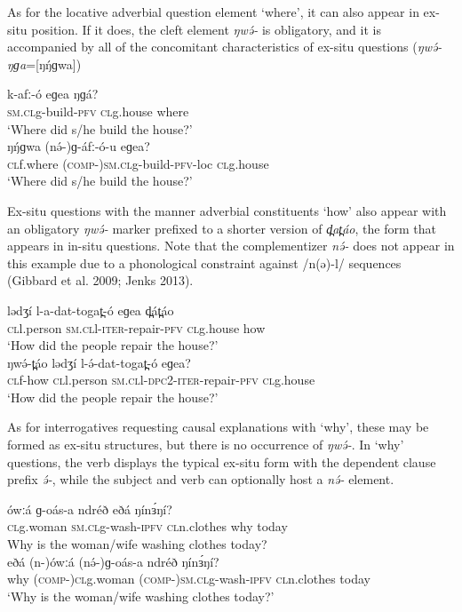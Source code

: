 As for the locative adverbial question element ‘where’, it can also appear in ex-situ position. If it does, the cleft element \textit{ŋwə́-} is obligatory, and it is accompanied by all of the concomitant characteristics of ex-situ questions (\textit{ŋwə́-ŋɡa}=[ŋŋ́ɡwa])       

\ea
\ea \gll	k-afː-ó	eɡea	ŋɡá?\\
		\textsc{sm.cl}g-build-\textsc{pfv}	\textsc{cl}g.house	where\\
\trans		‘Where did s/he build the house?’\\
\ex \gll	ŋŋ́ɡwa	(nə́-)ɡ-áfː-ó-u	eɡea?\\
		\textsc{cl}f.where	(\textsc{comp-})\textsc{sm.cl}g-build-\textsc{pfv}-loc	\textsc{cl}g.house\\
\trans		‘Where did s/he build the house?’\\
\z
\z

Ex-situ questions with the manner adverbial constituents ‘how’ also appear with an obligatory \textit{ŋwə́-} marker prefixed to a shorter version of \textit{d̪at̪áo}, the form that appears in in-situ questions. Note that the complementizer \textit{nə́-} does not appear in this example due to a phonological constraint against /n(ə)-l/ sequences (Gibbard et al. 2009; Jenks 2013). 

\ea
\ea \gll		lədʒí	l-a-dat-togat̪-ó	eɡea	d̪át̪áo  \\
	\textsc{cl}l.person	\textsc{sm.cl}l-\textsc{iter}-repair-\textsc{pfv}	\textsc{cl}g.house	how  \\
\trans	‘How did the people repair the house?’\\
\ex \gll	 ŋwə́-t̪áo	lədʒí	l-ə́-dat-togat̪-ó	eɡea?\\
	\textsc{cl}f-how	\textsc{cl}l.person	\textsc{sm.cl}l-\textsc{dpc}2-\textsc{iter}-repair-\textsc{pfv}	\textsc{cl}g.house\\
\trans	‘How did the people repair the house?’\\
\z
\z

As for interrogatives requesting causal explanations with ‘why’, these may be formed as ex-situ structures, but there is no occurrence of \textit{ŋwə́-}. In ‘why’ questions, the verb displays the typical ex-situ form with the dependent clause prefix \textit{ə́-}, while the subject and verb can optionally host a \textit{nə́-} element.

\ea
\ea \gll	ówːá	ɡ-oás-a	ndréð	eðá	ŋínɜ́ŋí?\\
	\textsc{cl}g.woman	\textsc{sm.cl}g-wash-\textsc{ipfv}	\textsc{cl}n.clothes	why	today\\
\trans		Why is the woman/wife washing clothes today?\\
\ex \gll	eðá	(n-)ówːá	(nə́-)ɡ-oás-a	ndréð	ŋínɜ́ŋí?\\
	why	(\textsc{comp-})\textsc{cl}g.woman	(\textsc{comp-})\textsc{sm.cl}g-wash-\textsc{ipfv}	\textsc{cl}n.clothes	today\\
\trans		‘Why is the woman/wife washing clothes today?’\\
\z
\z

